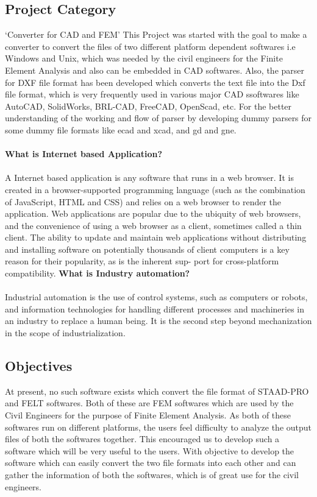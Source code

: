 \subsection{Project Category}
‘Converter for CAD and FEM’ This Project was started with the goal to make a converter to convert the files of two different platform dependent softwares i.e Windows and Unix, which was needed by the civil engineers for the Finite Element Analysis and also can be embedded in CAD softwares. Also, the parser for DXF file format has been developed which converts the text file into the Dxf file format, which is very frequently used in various major CAD ssoftwares like AutoCAD, SolidWorks, BRL-CAD, FreeCAD, OpenScad, etc. For the better understanding of the working and flow of parser by developing dummy parsers for some dummy file formats like ecad and xcad, and gd and gne.\\\\
\textbf{What is Internet based Application?}\\\\
A Internet based application is any software that runs in a web browser. It is created
in a browser-supported programming language (such as the combination of JavaScript,
HTML and CSS) and relies on a web browser to render the application.
Web applications are popular due to the ubiquity of web browsers, and the convenience
of using a web browser as a client, sometimes called a thin client. The ability to update
and maintain web applications without distributing and installing software on potentially
thousands of client computers is a key reason for their popularity, as is the inherent sup-
port for cross-platform compatibility.
\textbf{What is Industry automation?}\\\\
Industrial automation is the use of control systems, such as computers or robots, and
information technologies for handling different processes and machineries in an industry
to replace a human being. It is the second step beyond mechanization in the scope of
industrialization.
\subsection{Objectives}
At present, no such software exists which convert the file format of
STAAD-PRO and FELT softwares. Both of these are FEM softwares which
are used by the Civil Engineers for the purpose of Finite Element
Analysis. As both of these softwares run on different platforms, the
users feel difficulty to analyze the output files of both the
softwares together. This encouraged us to develop such a software
which will be very useful to the users. With objective to develop the
software which can easily convert the two file formats into each other
and can gather the information of both the softwares, which is of
great use for the civil engineers.\\


